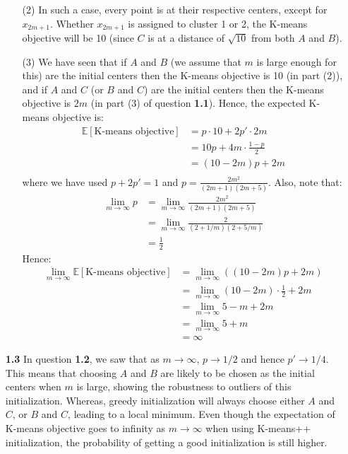 \documentclass{article}
\begin{document}
\begin{itemize}
\begin{itemize}
      \item[(2)] In such a case, every point is at their respective centers, except for $x_{2m+1}$.
      Whether $x_{2m+1}$ is assigned to cluster 1 or 2, the K-means objective will be 10 (since $C$ is at a distance of $\sqrt{10}$ from both $A$ and $B$).

      \item[(3)] We have seen that if $A$ and $B$ (we assume that $m$ is large enough for this) are the initial centers then the K-means objective is 10 (in part (2)), and if $A$ and $C$ (or $B$ and $C$) are the initial centers then the K-means objective is $2m$ (in part (3) of question \textbf{1.1}).
      Hence, the expected K-means objective is:
      \begin{align*}
        \mathbb{E}[\text{K-means objective}] &= p \cdot 10 + 2p' \cdot 2m \\
        &= 10p + 4m \cdot \frac{1-p}{2} \\
        &= (10 - 2m)p + 2m \\
      \end{align*}
      where we have used $p + 2p' = 1$ and $p = \frac{2m^2}{(2m + 1)(2m + 5)}$.
      Also, note that:
      \begin{align*}
        \lim_{m \to \infty} p &= \lim_{m \to \infty} \frac{2m^2}{(2m + 1)(2m + 5)} \\
        &= \lim_{m \to \infty} \frac{2}{(2 + 1/m)(2 + 5/m)} \\
        &= \frac{1}{2}
      \end{align*}
      Hence:
      \begin{align*}
        \lim_{m \to \infty} \mathbb{E}[\text{K-means objective}] &= \lim_{m \to \infty} \left( (10 - 2m)p + 2m \right) \\
        &= \lim_{m \to \infty} (10 - 2m) \cdot \frac{1}{2} + 2m \\
        &= \lim_{m \to \infty} 5 - m + 2m \\
        &= \lim_{m \to \infty} 5 + m \\
        &= \infty
      \end{align*}
    \end{itemize}
    
    \item[\textbf{1.3}] In question \textbf{1.2}, we saw that as $m \to \infty$, $p \to 1/2$ and hence $p' \to 1/4$.
    This means that choosing $A$ and $B$ are likely to be chosen as the initial centers when $m$ is large, showing the robustness to outliers of this initialization.
    Whereas, greedy initialization will always choose either $A$ and $C$, or $B$ and $C$, leading to a local minimum.
    Even though the expectation of K-means objective goes to infinity as $m \to \infty$ when using K-means++ initialization, the probability of getting a good initialization is still higher.
  \end{itemize}
  
\end{document}
